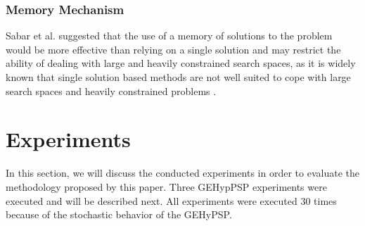 \documentclass[conference]{IEEEtran}
\begin{document}
 

\subsubsection{Memory Mechanism}
Sabar et al. \cite{sabar2015automatic} suggested that the use of a memory of solutions to the problem would be more effective than relying on a single solution and may restrict the ability of dealing with large and heavily constrained search spaces, as it is widely known that single
solution based methods are not well suited to cope with
large search spaces and heavily constrained problems \cite{blum2011hybrid}.


%
%
%
%
%	
%	
%
%
%

\section{Experiments}
\label{sec:experiments}

In this section, we will discuss the conducted experiments in order to evaluate the methodology proposed by this paper. Three GEHypPSP experiments were executed and will be described next. All experiments were executed 30 times because of the stochastic behavior of the GEHyPSP. 
\end{document}
